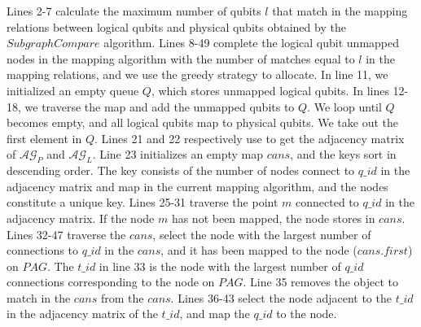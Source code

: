\documentclass[runningheads]{llncs}
\begin{document}
Lines 2-7 calculate the maximum number of qubits $l$ that match in the mapping relations between logical qubits and physical qubits obtained by the $SubgraphCompare$ algorithm. Lines 8-49 complete the logical qubit unmapped nodes in the mapping algorithm with the number of matches equal to $l$ in the mapping relations, and we use the greedy strategy to allocate. In line 11, we initialized an empty queue $Q$, which stores unmapped logical qubits. In lines 12-18, we traverse the map and add the unmapped qubits to $Q$. We loop until $Q$ becomes empty, and all logical qubits map to physical qubits. We take out the first element in $Q$. Lines 21 and 22 respectively use to get the adjacency matrix of $\mathcal{AG}_{P}$ and $\mathcal{AG}_{L}$. Line 23 initializes an empty map $cans$, and the keys sort in descending order. The key consists of the number of nodes connect to $q\_id$ in the adjacency matrix and map in the current mapping algorithm, and the nodes constitute a unique key. Lines 25-31 traverse the point $m$ connected to $q\_id$ in the adjacency matrix. If the node $m$ has not been mapped, the node stores in $cans$. Lines 32-47 traverse the $cans$, select the node with the largest number of connections to $q\_id$ in the $cans$, and it has been mapped to the node ($cans.first$) on $PAG$. The $t\_id$ in line 33 is the node with the largest number of $q\_id$ connections corresponding to the node on $PAG$. Line 35  removes the object to match in the $cans$ from the $cans$. Lines 36-43  select the node adjacent to the $t\_id$ in the adjacency matrix of the $t\_id$, and map the $q\_id$ to the node.
\end{document}
